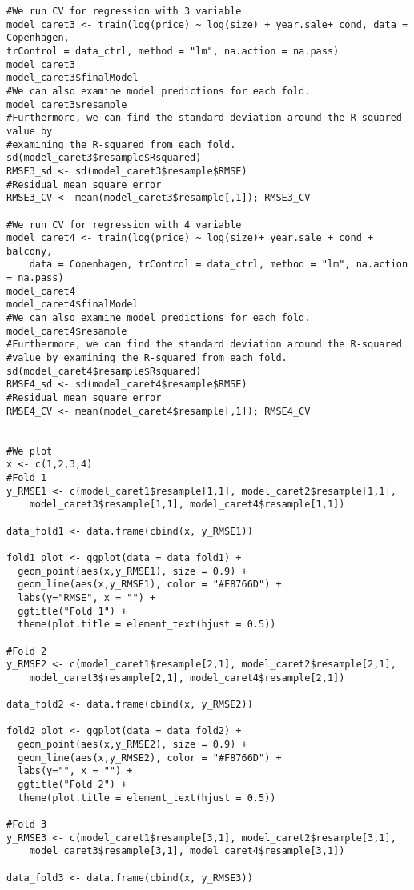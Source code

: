 \begin{lstlisting}
#We run CV for regression with 3 variable
model_caret3 <- train(log(price) ~ log(size) + year.sale+ cond, data = Copenhagen,
trControl = data_ctrl, method = "lm", na.action = na.pass)
model_caret3
model_caret3$finalModel
#We can also examine model predictions for each fold.
model_caret3$resample
#Furthermore, we can find the standard deviation around the R-squared value by
#examining the R-squared from each fold.
sd(model_caret3$resample$Rsquared)
RMSE3_sd <- sd(model_caret3$resample$RMSE)
#Residual mean square error
RMSE3_CV <- mean(model_caret3$resample[,1]); RMSE3_CV 

#We run CV for regression with 4 variable
model_caret4 <- train(log(price) ~ log(size)+ year.sale + cond + balcony, 
    data = Copenhagen, trControl = data_ctrl, method = "lm", na.action = na.pass)
model_caret4
model_caret4$finalModel
#We can also examine model predictions for each fold.
model_caret4$resample
#Furthermore, we can find the standard deviation around the R-squared 
#value by examining the R-squared from each fold.
sd(model_caret4$resample$Rsquared)
RMSE4_sd <- sd(model_caret4$resample$RMSE)
#Residual mean square error
RMSE4_CV <- mean(model_caret4$resample[,1]); RMSE4_CV 


#We plot
x <- c(1,2,3,4)
#Fold 1
y_RMSE1 <- c(model_caret1$resample[1,1], model_caret2$resample[1,1], 
    model_caret3$resample[1,1], model_caret4$resample[1,1])

data_fold1 <- data.frame(cbind(x, y_RMSE1))

fold1_plot <- ggplot(data = data_fold1) + 
  geom_point(aes(x,y_RMSE1), size = 0.9) + 
  geom_line(aes(x,y_RMSE1), color = "#F8766D") + 
  labs(y="RMSE", x = "") +
  ggtitle("Fold 1") +
  theme(plot.title = element_text(hjust = 0.5))

#Fold 2
y_RMSE2 <- c(model_caret1$resample[2,1], model_caret2$resample[2,1],
    model_caret3$resample[2,1], model_caret4$resample[2,1])

data_fold2 <- data.frame(cbind(x, y_RMSE2))

fold2_plot <- ggplot(data = data_fold2) + 
  geom_point(aes(x,y_RMSE2), size = 0.9) + 
  geom_line(aes(x,y_RMSE2), color = "#F8766D") + 
  labs(y="", x = "") +
  ggtitle("Fold 2") +
  theme(plot.title = element_text(hjust = 0.5))

#Fold 3
y_RMSE3 <- c(model_caret1$resample[3,1], model_caret2$resample[3,1], 
    model_caret3$resample[3,1], model_caret4$resample[3,1])

data_fold3 <- data.frame(cbind(x, y_RMSE3))


\end{lstlisting}
